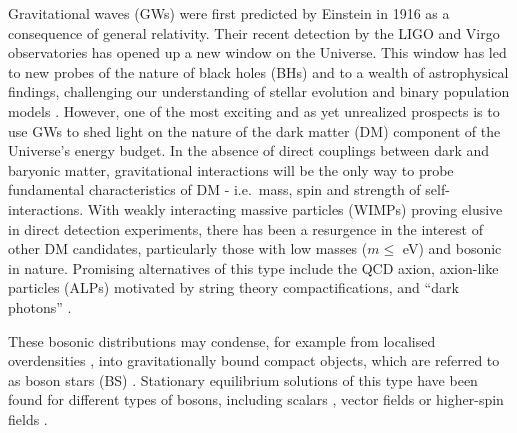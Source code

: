 \documentclass[11pt]{report}  %
\begin{document}
Gravitational waves (GWs) were first predicted by Einstein in 1916 as
a consequence of general relativity.  Their recent detection by the
LIGO and Virgo observatories has opened up a new window on the
Universe. This window has led to new probes of the nature of black holes
(BHs) and to a wealth of astrophysical findings, challenging our
understanding of stellar evolution and binary population models \cite{LIGOScientific:2016aoc,LIGOScientific:2018jsj,LIGOScientific:2020kqk,LIGOScientific:2021psn}.
However, one of the most exciting and as yet unrealized prospects is
to use GWs to shed light on the nature of the dark matter (DM)
component of the Universe's energy budget. In the absence of direct
couplings between dark and baryonic matter, gravitational interactions will be the only way to
probe fundamental characteristics of DM - i.e.~mass, spin and strength
of self-interactions.  With weakly interacting massive particles (WIMPs)
proving elusive in direct detection experiments, there has been a resurgence in the interest of other DM
candidates, particularly those with low masses ($m \leq $ eV) and bosonic in nature.
Promising alternatives of this type include the QCD axion, axion-like particles
(ALPs) motivated by string theory compactifications, and ``dark
photons'' \cite{Arkani-Hamed:2008hhe,Feng:2010gw,Marsh:2015xka,Svrcek:2006yi,Kim:1986ax,Arvanitaki:2009fg,Ringwald:2012cu,Wilczek:1977pj,Peccei:1977hh,Weinberg:1977ma}.

These bosonic distributions may condense, for example from localised overdensities \cite{Widdicombe:2018oeo}, into gravitationally bound compact objects, which are referred to as boson stars (BS) \cite{Amin:2018xfe,PhysRev.172.1331,PhysRev.187.1767,PhysRev.97.511,Visinelli:2021uve,Liebling:2012fv,Schunck:2003kk,Guerra:2019srj,Vaglio:2022flq,Cardoso:2022vpj,Amin:2021tnq,Zhang:2020bec}. Stationary equilibrium solutions of this type have been
found for different types of bosons, including scalars \cite{Sanchis-Gual:2020mzb,Alcubierre:2021psa,Boskovic:2021nfs,Astefanesei:2003qy,Kaup:1968zz,Ruffini:1969qy,Colpi:1986ye,Lee:1986ts,Friedberg:1986tq,Schunck:1999zu,Jetzer:1989av,Pugliese:2013gsa,Hawley:2002zn,Urena-Lopez:2012udq,Muia:2019coe,Helfer:2016ljl,Alcubierre:2018ahf,Coleman:1985ki,Guerra:2019srj,Kleihaus:2005me,Kleihaus:2011sx,Cardoso:2014sna,Amin:2014fua,Amin:2011hj,Amin:2010dc}, vector fields \cite{Brito:2015pxa,Minamitsuji:2018kof,Brito:2015yga,Zhang:2021xxa,CalderonBustillo:2022cja,March-Russell:2022zll,Gorghetto:2022sue,Herdeiro:2021lwl,Bustillo:2020syj,Minamitsuji:2017pdr,Sanchis-Gual:2017bhw,Duarte:2016lig,SalazarLandea:2016bys,Zilhao:2015tya} or higher-spin fields \cite{Jain:2021pnk}.
\end{document}
